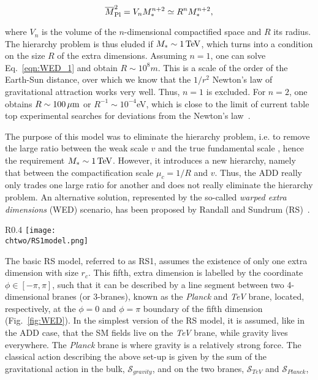 \begin{equation}\label{eqn:WED_1}
\overline{M}_\mathrm{Pl}^2 = V_nM^{n+2}_* \simeq R^nM^{n+2}_*,
\end{equation}

\noindent where $V_n$ is the volume of the $n$-dimensional compactified space and $R$ its radius.
The hierarchy problem is thus eluded if $M_* \sim 1\,\text{Te\hspace{-.08em}V}$, which turns into a condition on the size $R$ of the extra dimensions.
Assuming $n = 1$, one can solve Eq.~\ref{eqn:WED_1} and obtain $R \sim 10^8\unit{m}$.
This is a scale of the order of the Earth-Sun distance, over which we know that the $1/r^2$ Newton's law of gravitational attraction works very well. Thus, $n = 1$ is excluded.
For $n = 2$, one obtains $R \sim 100\,\mu\text{m}$ or $R^{-1} \sim 10^{-4}$\unit{eV}, which is close to the limit of current table top experimental searches for deviations from the Newton's law~\cite{Hoyle:2004cw}. 

The purpose of this model was to eliminate the hierarchy problem, i.e. to remove the large ratio between the weak scale $v$ and the true fundamental scale \bMPl, hence the requirement $M_* \sim 1\,\text{Te\hspace{-.08em}V}$.
However, it introduces a new hierarchy, namely that between the compactification scale $\mu_c = 1/R$ and $v$.
Thus, the ADD really only trades one large ratio for another and does not really eliminate the hierarchy problem.
An alternative solution, represented by the so-called \textit{warped extra dimensions} (WED) scenario, has been proposed by Randall and Sundrum (RS)~\cite{Randall:1999ee}.

\begin{wrapfigure}{R}{0.4\textwidth}
 \centering
 \texttt{[image: \\chtwo/RS1model.png]}
 \caption{Set-up of the five dimensions in the RS model. The \textit{Planck} and \textit{TeV} branes are the 4-dimensional boundaries of the extra dimension $\phi$ compactified in an interval $[0,\pi]$.}
 \label{fig:WED}
\end{wrapfigure}

The basic RS model, referred to as RS1, assumes the existence of only one extra dimension with size $r_c$. This fifth, extra dimension is labelled by the coordinate $\phi \in [-\pi,\pi]$,
such that it can be described by a line segment between two 4-dimensional branes (or 3-branes), known as the \textit{Planck} and \textit{TeV} brane, located, respectively,
at the $\phi = 0$ and $\phi = \pi$ boundary of the fifth dimension (Fig.~\ref{fig:WED}).
In the simplest version of the RS model, it is assumed, like in the ADD case, that the SM fields live on the \textit{TeV} brane, while gravity lives everywhere.
The \textit{Planck} brane is where gravity is a relatively strong force.
The classical action describing the above set-up is given by the sum of the gravitational action in the bulk, $\mathcal{S}_{gravity}$, and on the two branes, $\mathcal{S}_{TeV}$ and $\mathcal{S}_{Planck}$,

